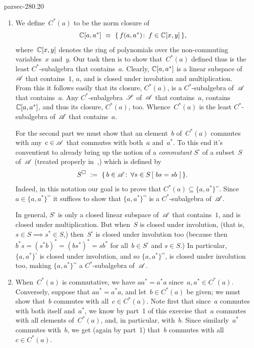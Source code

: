 \documentclass[b5page]{book}
\begin{document}
\begin{solution}{parsec-280.20}
\begin{enumerate}
\item
We define~$C^*(a)$ to be
the norm closure of
\begin{equation*}
\C[a,a^*]\ \equiv\  \{\,f(a,a^*)\colon \,f\in \C[x,y]\,\},
\end{equation*}
where~$\mathbb{C}[x,y]$ denotes the ring
of polynomials over the non-commuting variables~$x$ and~$y$.
Our task then is to show that~$C^*(a)$
defined thus is the least $C^*$-subalgebra
that contains~$a$.
Clearly, $\mathbb{C}[a,a^*]$ is a linear subspace of~$\mathscr{A}$
that contains~$1$, $a$, and is
closed under involution and multiplication.
From this it follows easily that its closure, $C^*(a)$,
is a $C^*$-subalgebra of~$\mathscr{A}$ that contains~$a$.
Any $C^*$-subalgebra~$\mathscr{S}$ of~$\mathscr{A}$
that contains~$a$, contains $\mathbb{C}[a,a^*]$, 
and thus its closure, $C^*(a)$, too.
Whence~$C^*(a)$ is the least $C^*$-subalgebra of~$\mathscr{A}$ that 
contains~$a$.

For the second part
we must show that an element~$b$ of~$C^*(a)$
commutes with any~$c\in \mathscr{A}$
that commutes with both~$a$ and~$a^*$.
To this end it's conventient 
to already bring up the notion
of a \emph{commutant} $S^\square$ of 
a subset~$S$ of~$\mathscr{A}$
(treated properly in~,)
which is defined by
\begin{equation*}
S^\square\ := \ \{\,
b\in \mathscr{A}\colon\, \forall s\in S\,[\ bs=sb\ ]\,\}.
\end{equation*}
Indeed,
in this notation
our goal is to prove that
$C^*(a)\subseteq \{a,a^*\}^{\square\square}$.
Since $a\in \{a,a^*\}^{\square\square}$
it suffices  to show that $\{a,a^*\}^{\square\square}$
is a $C^*$-subalgebra of~$\mathscr{A}$.

In general, $S^\square$ is only a closed linear subspace
of~$\mathscr{A}$ that contains~$1$,
and is closed under multiplication.
But when~$S$ is closed under involution,
(that is, $s\in S\implies s^*\in S$,)
then~$S^\square$
is closed under involution too
(because then $b^*s=(s^*b)^*=(bs^*)^*=sb^*$
for all~$b\in S^\square$ and $s\in S$.)
In particular, $\{a,a^*\}^\square$
is closed under involution,
and 
so  $\{a,a^*\}^{\square\square}$,
is closed under involution too,
making $\{a,a^*\}^{\square\square}$ a $C^*$-subalgebra of~$\mathscr{A}$.

\item 
When~$C^*(a)$ is commutative,
we have
$aa^*=a^*a$ since~$a,a^*\in C^*(a)$.
Conversely,
suppose that $aa^*=a^*a$,
and let~$b\in C^*(a)$ be given;
we must show that~$b$ commutes with all~$c\in C^*(a)$.
Note first that
since~$a$ commutes with both itself and~$a^*$,
we know by part~1 of this exercise
that~$a$ commutes with all elements of~$C^*(a)$,
and, in particular, with~$b$.
Since similarly~$a^*$ commutes with~$b$,
we get (again by part~1)
that~$b$ commutes with all~$c\in C^*(a)$.


\end{enumerate}
\end{solution}
\end{document}
